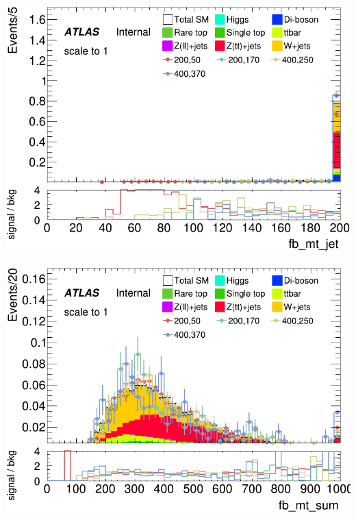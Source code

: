 \documentclass[usenames,dvipsnames]{beamer}
\begin{document}
\begin{frame}
\begin{minipage}{0.25\textwidth}
        \includegraphics[width=\textwidth]{graphics/HH_met_sig/HH_fb_mt_jet_norm.png}
    \end{minipage}
    \hfill
    \begin{minipage}{0.25\textwidth}
        \centering
        \includegraphics[width=\textwidth]{graphics/HH_met_sig/HH_fb_mt_sum_norm.png}
    \end{minipage}
\end{frame}
\end{document}

